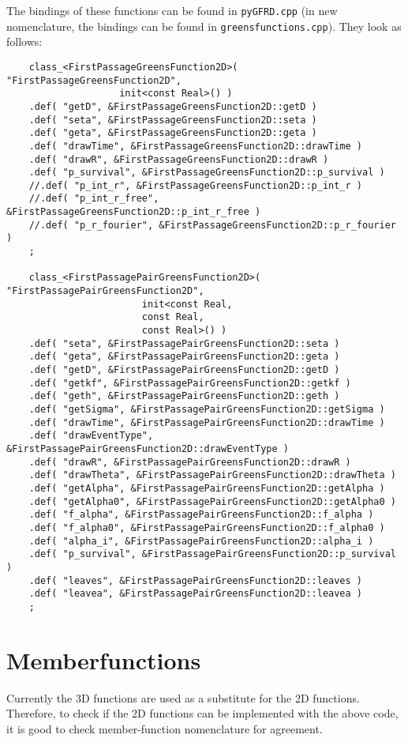 \documentclass[a4paper,10pt]{article}
\begin{document}
The bindings of these functions can be found in \texttt{pyGFRD.cpp} (in new nomenclature, the bindings can be found in \texttt{greensfunctions.cpp}). They look as follows:

\label{boostdeclaration}
\begin{verbatim}
    class_<FirstPassageGreensFunction2D>( "FirstPassageGreensFunction2D",
					init<const Real>() )
	.def( "getD", &FirstPassageGreensFunction2D::getD )
	.def( "seta", &FirstPassageGreensFunction2D::seta )
	.def( "geta", &FirstPassageGreensFunction2D::geta )
	.def( "drawTime", &FirstPassageGreensFunction2D::drawTime )
	.def( "drawR", &FirstPassageGreensFunction2D::drawR )
	.def( "p_survival", &FirstPassageGreensFunction2D::p_survival )
	//.def( "p_int_r", &FirstPassageGreensFunction2D::p_int_r )
	//.def( "p_int_r_free", &FirstPassageGreensFunction2D::p_int_r_free )
	//.def( "p_r_fourier", &FirstPassageGreensFunction2D::p_r_fourier )
	;

    class_<FirstPassagePairGreensFunction2D>( "FirstPassagePairGreensFunction2D",
					    init<const Real, 
					    const Real,
					    const Real>() )
	.def( "seta", &FirstPassagePairGreensFunction2D::seta )
	.def( "geta", &FirstPassagePairGreensFunction2D::geta )
	.def( "getD", &FirstPassagePairGreensFunction2D::getD )
	.def( "getkf", &FirstPassagePairGreensFunction2D::getkf )
	.def( "geth", &FirstPassagePairGreensFunction2D::geth )
	.def( "getSigma", &FirstPassagePairGreensFunction2D::getSigma )
	.def( "drawTime", &FirstPassagePairGreensFunction2D::drawTime )
	.def( "drawEventType", &FirstPassagePairGreensFunction2D::drawEventType )
	.def( "drawR", &FirstPassagePairGreensFunction2D::drawR )
	.def( "drawTheta", &FirstPassagePairGreensFunction2D::drawTheta )
	.def( "getAlpha", &FirstPassagePairGreensFunction2D::getAlpha )
	.def( "getAlpha0", &FirstPassagePairGreensFunction2D::getAlpha0 )
	.def( "f_alpha", &FirstPassagePairGreensFunction2D::f_alpha )
	.def( "f_alpha0", &FirstPassagePairGreensFunction2D::f_alpha0 )
	.def( "alpha_i", &FirstPassagePairGreensFunction2D::alpha_i )
	.def( "p_survival", &FirstPassagePairGreensFunction2D::p_survival )
	.def( "leaves", &FirstPassagePairGreensFunction2D::leaves )
	.def( "leavea", &FirstPassagePairGreensFunction2D::leavea )
	;
\end{verbatim} 

\section{Memberfunctions}

Currently the 3D functions are used as a substitute for the 2D functions. Therefore, to check if the 2D functions can be implemented with the above code, it is good to check member-function nomenclature for agreement.
\end{document}
